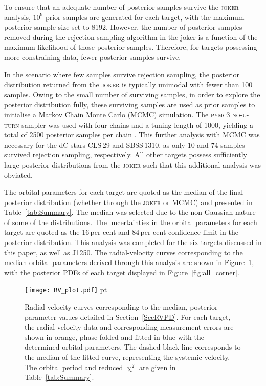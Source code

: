 \documentclass[fleqn,usenatbib,useAMS]{mnras}
\begin{document}
To ensure that an adequate number of posterior samples survive the \textsc{joker} analysis, $10^9$ prior samples are generated for each target, with the maximum posterior sample size set to 8192.  However, the number of posterior samples removed during the rejection sampling algorithm in the {\sc joker} is a function of the maximum likelihood of those posterior samples.  Therefore, for targets possessing more constraining data, fewer posterior samples survive.

In the scenario where few samples survive rejection sampling, the posterior distribution returned from the \textsc{joker} is typically unimodal with fewer than 100 samples.  Owing to the small number of surviving samples, in order to explore the posterior distribution fully, these surviving samples are used as prior samples to initialise a Markov Chain Monte Carlo (MCMC) simulation.  The \textsc{pymc3 no-u-turn} sampler was used with four chains and a tuning length of 1000, yielding a total of 2500 posterior samples per chain \citep{pymc3,NUTS}.  This further analysis with MCMC was necessary for the dC stars CLS\,29 and SBSS\,1310, as only 10 and 74 samples survived rejection sampling, respectively.  All other targets possess sufficiently large posterior distributions from the \textsc{joker} such that this additional analysis was obviated.

The orbital parameters for each target are quoted as the median of the final posterior distribution (whether through the \textsc{joker} or MCMC) and presented in Table~\ref{tab:Summary}.  The median was selected due to the non-Gaussian nature of some of the distributions.  The uncertainties in the orbital parameters for each target are quoted as the 16\,per cent and 84\,per cent confidence limit in the posterior distribution.  This analysis was completed for the six targets discussed in this paper, as well as J1250.  The radial-velocity curves corresponding to the median orbital parameters derived through this analysis are shown in Figure~\ref{fig:RV}, with the posterior PDFs of each target displayed in Figure~\ref{fig:all_corner}.



\begin{figure}
\texttt{[image: RV\_plot.pdf]}
 pt
\caption{Radial-velocity curves corresponding to the median, posterior parameter values detailed in Section~\ref{SecRVPD}.  For each target, the radial-velocity data and corresponding measurement errors are shown in orange, phase-folded and fitted in blue with the determined orbital parameters.  The dashed black line corresponds to the median of the fitted curve, representing the systemic velocity.  The orbital period and reduced $\upchi^2$ are given in Table~\ref{tab:Summary}.}
\label{fig:RV}
\end{figure}
\end{document}
